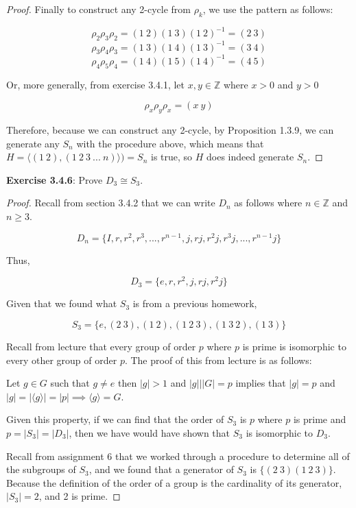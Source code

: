 \documentclass[a4paper]{article}
\begin{document}
\begin{myparindent}{0pt}
\begin{proof}
  Finally to construct any 2-cycle from $\rho_k$, we use the pattern as follows:

  \[ \rho_2 \rho_3 \rho_2 = (1 ~2)(1 ~3)(1 ~2)^{-1} = (2 ~3) \]
  \[ \rho_3 \rho_4 \rho_3 = (1 ~3)(1 ~4)(1 ~3)^{-1} = (3 ~4) \]
  \[ \rho_4 \rho_5 \rho_4 = (1 ~4)(1 ~5)(1 ~4)^{-1} = (4 ~5) \]

  Or, more generally, from exercise 3.4.1, let $x, y \in \mathbb{Z}$ where $x > 0$ and $y > 0$

  \[ \rho_x \rho_y \rho_x = (x ~y) \]

  Therefore, because we can construct any 2-cycle, by Proposition 1.3.9, we can
  generate any $S_n$ with the procedure above, which means that
  $H = \langle (1 ~2), (1 ~2 ~3 ~... ~n) \rangle) = S_n$ is true, so $H$ does
  indeed generate $S_n$.
\end{proof}

\textbf{Exercise 3.4.6}:
Prove $D_3 \cong S_3$.
\begin{proof}
  Recall from section 3.4.2 that we can write $D_n$ as follows where
  $n \in \mathbb{Z}$ and $n \ge 3$.

  \[ D_n = \{I, r, r^2, r^3,..., r^{n-1},j,rj, r^2 j, r^3 j,..., r^{n-1} j \} \]

  Thus,

  \[ D_3 = \{ e, r, r^2, j, rj, r^2j \} \]

  Given that we found what $S_3$ is from a previous homework,

  \[ S_3 = \{ e, (2 ~3), (1 ~2), (1 ~2 ~3), (1 ~3 ~2), (1 ~3) \} \]

  Recall from lecture that every group of order $p$ where $p$ is prime is
  isomorphic to every other group of order $p$. The proof of this from lecture
  is as follows:

  Let $g \in G$ such that $g \neq e$ then $|g| > 1$ and $|g| \vert |G| = p$
  implies that $|g| = p$ and $|g| = |\langle g \rangle| = |p| \implies \langle g \rangle = G$. \newline

  Given this property, if we can find that the order of $S_3$ is $p$ where $p$
  is prime and $p = |S_3| = |D_3|$, then we have would have shown that $S_3$ is
  isomorphic to $D_3$. \newline

  Recall from assignment 6 that we worked through a
  procedure to determine all of the subgroups of $S_3$, and we found that a
  generator of $S_3$ is $\{ (2 ~3) (1 ~2 ~3)\}$. Because the definition of the
  order of a group is the cardinality of its generator, $|S_3| = 2$, and 2 is
  prime.
  \newline


\end{proof}
\end{myparindent}
\end{document}
